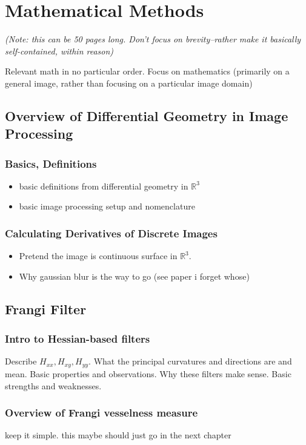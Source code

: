 
\chapter{Mathematical Methods}

\textit{(Note: this can be 50 pages long. Don't focus on brevity--rather make it basically self-contained, within reason)}

Relevant math in no particular order. Focus on mathematics (primarily on a general image, rather than focusing on a particular image domain)


\section{Overview of Differential Geometry in Image Processing}
	\subsection{Basics, Definitions}
	\begin{itemize}
	\item basic definitions from differential geometry in $\mathbb{R}^3$
	\item basic image processing setup and nomenclature
	\end{itemize}
	\subsection{Calculating Derivatives of Discrete Images} 
	\begin{itemize}
	\item Pretend the image is continuous surface in $\mathbb{R}^3$.
	\item Why gaussian blur is the way to go (see paper i forget whose)
	\end{itemize}
	\section{Frangi Filter}
	\subsection{Intro to Hessian-based filters}
	Describe $H_{xx}, H_{xy}, H_{yy}$. What the principal curvatures and directions are and mean. Basic properties and observations. Why these filters make sense. Basic strengths and weaknesses.
	\subsection{Overview of Frangi vesselness measure} keep it simple. this maybe should just go in the next chapter
